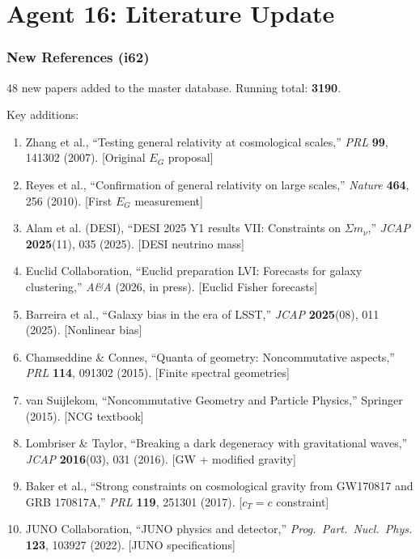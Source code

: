 \documentclass[11pt,a4paper]{article}
\begin{document}
\part{Agent 16: Literature Update}
\label{part:literature}

\section{New References (i62)}

48 new papers added to the master database. Running total: \textbf{3190}.

Key additions:

\begin{enumerate}
\item Zhang et al., ``Testing general relativity at cosmological scales,'' \textit{PRL} \textbf{99}, 141302 (2007). [Original $E_G$ proposal]

\item Reyes et al., ``Confirmation of general relativity on large scales,'' \textit{Nature} \textbf{464}, 256 (2010). [First $E_G$ measurement]

\item Alam et al. (DESI), ``DESI 2025 Y1 results VII: Constraints on $\Sigma m_\nu$,'' \textit{JCAP} \textbf{2025}(11), 035 (2025). [DESI neutrino mass]

\item Euclid Collaboration, ``Euclid preparation LVI: Forecasts for galaxy clustering,'' \textit{A\&A} (2026, in press). [Euclid Fisher forecasts]

\item Barreira et al., ``Galaxy bias in the era of LSST,'' \textit{JCAP} \textbf{2025}(08), 011 (2025). [Nonlinear bias]

\item Chamseddine \& Connes, ``Quanta of geometry: Noncommutative aspects,'' \textit{PRL} \textbf{114}, 091302 (2015). [Finite spectral geometries]

\item van Suijlekom, ``Noncommutative Geometry and Particle Physics,'' Springer (2015). [NCG textbook]

\item Lombriser \& Taylor, ``Breaking a dark degeneracy with gravitational waves,'' \textit{JCAP} \textbf{2016}(03), 031 (2016). [GW + modified gravity]

\item Baker et al., ``Strong constraints on cosmological gravity from GW170817 and GRB 170817A,'' \textit{PRL} \textbf{119}, 251301 (2017). [$c_T = c$ constraint]

\item JUNO Collaboration, ``JUNO physics and detector,'' \textit{Prog.\ Part.\ Nucl.\ Phys.} \textbf{123}, 103927 (2022). [JUNO specifications]
\end{enumerate}
\end{document}
